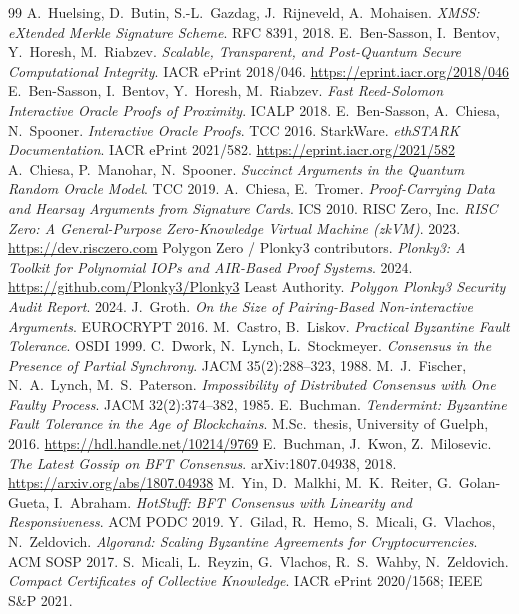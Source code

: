 \documentclass[11pt]{article}
\theoremstyle{plain}
\theoremstyle{definition}
\theoremstyle{remark}
\begin{document}
\begin{thebibliography}{99}
 A.~Huelsing, D.~Butin, S.-L.~Gazdag, J.~Rijneveld, A.~Mohaisen. \emph{XMSS: eXtended Merkle Signature Scheme}. RFC 8391, 2018.
 E.~Ben-Sasson, I.~Bentov, Y.~Horesh, M.~Riabzev. \emph{Scalable, Transparent, and Post-Quantum Secure Computational Integrity}. IACR ePrint 2018/046. \url{https://eprint.iacr.org/2018/046}
 E.~Ben-Sasson, I.~Bentov, Y.~Horesh, M.~Riabzev. \emph{Fast Reed-Solomon Interactive Oracle Proofs of Proximity}. ICALP 2018.
 E.~Ben-Sasson, A.~Chiesa, N.~Spooner. \emph{Interactive Oracle Proofs}. TCC 2016.
 StarkWare. \emph{ethSTARK Documentation}. IACR ePrint 2021/582. \url{https://eprint.iacr.org/2021/582}
 A.~Chiesa, P.~Manohar, N.~Spooner. \emph{Succinct Arguments in the Quantum Random Oracle Model}. TCC 2019.
 A.~Chiesa, E.~Tromer. \emph{Proof-Carrying Data and Hearsay Arguments from Signature Cards}. ICS 2010.
 RISC Zero, Inc. \emph{RISC Zero: A General-Purpose Zero-Knowledge Virtual Machine (zkVM)}. 2023. \url{https://dev.risczero.com}
 Polygon Zero / Plonky3 contributors. \emph{Plonky3: A Toolkit for Polynomial IOPs and AIR-Based Proof Systems}. 2024. \url{https://github.com/Plonky3/Plonky3}
 Least Authority. \emph{Polygon Plonky3 Security Audit Report}. 2024.
 J.~Groth. \emph{On the Size of Pairing-Based Non-interactive Arguments}. EUROCRYPT 2016.
 M.~Castro, B.~Liskov. \emph{Practical Byzantine Fault Tolerance}. OSDI 1999.
 C.~Dwork, N.~Lynch, L.~Stockmeyer. \emph{Consensus in the Presence of Partial Synchrony}. JACM 35(2):288--323, 1988.
 M.~J.~Fischer, N.~A.~Lynch, M.~S.~Paterson. \emph{Impossibility of Distributed Consensus with One Faulty Process}. JACM 32(2):374--382, 1985.
 E.~Buchman. \emph{Tendermint: Byzantine Fault Tolerance in the Age of Blockchains}. M.Sc.\ thesis, University of Guelph, 2016. \url{https://hdl.handle.net/10214/9769}
 E.~Buchman, J.~Kwon, Z.~Milosevic. \emph{The Latest Gossip on BFT Consensus}. arXiv:1807.04938, 2018. \url{https://arxiv.org/abs/1807.04938}
 M.~Yin, D.~Malkhi, M.~K.~Reiter, G.~Golan-Gueta, I.~Abraham. \emph{HotStuff: BFT Consensus with Linearity and Responsiveness}. ACM PODC 2019.
 Y.~Gilad, R.~Hemo, S.~Micali, G.~Vlachos, N.~Zeldovich. \emph{Algorand: Scaling Byzantine Agreements for Cryptocurrencies}. ACM SOSP 2017.
 S.~Micali, L.~Reyzin, G.~Vlachos, R.~S.~Wahby, N.~Zeldovich. \emph{Compact Certificates of Collective Knowledge}. IACR ePrint 2020/1568; IEEE S\&P 2021.

\end{thebibliography}
\end{document}
